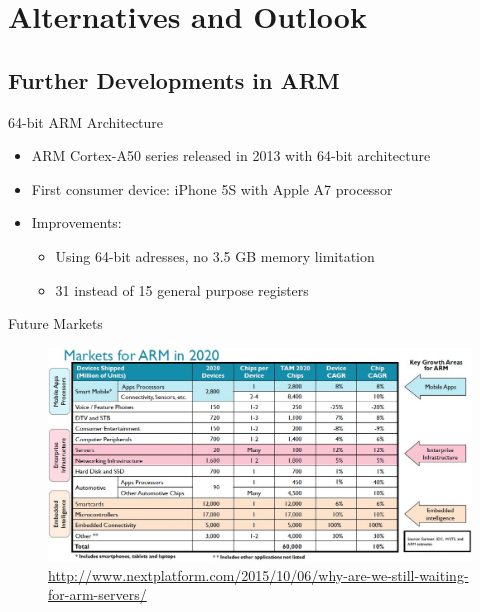 \documentclass{beamer}
\begin{document}


\section{Alternatives and Outlook}

\subsection{Further Developments in ARM}
\begin{frame}[t]{64-bit ARM Architecture}
 \begin{itemize}
  \item ARM Cortex-A50 series released in 2013 with 64-bit architecture
  \item First consumer device: iPhone 5S with Apple A7 processor
  \item Improvements:
  \begin{itemize}
    \item Using 64-bit adresses, no 3.5 GB memory limitation
    \item 31 instead of 15 general purpose registers
  \end{itemize}
\end{itemize}
\end{frame}

\begin{frame}[t]{Future Markets}
    \begin{figure}
    \includegraphics[width=\textwidth]{arm2020.jpg}
    \caption{\url{http://www.nextplatform.com/2015/10/06/why-are-we-still-waiting-for-arm-servers/}}
    \end{figure}
\end{frame}
\end{document}
